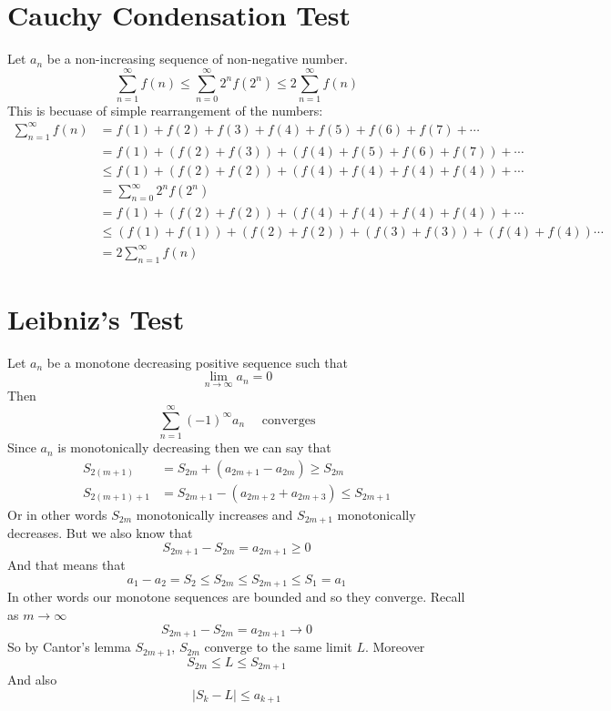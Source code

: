 \documentclass{article}
\begin{document}
	\section{Cauchy Condensation Test}
	Let $a_n$ be a non-increasing sequence of non-negative number.
	\[
		\sum_{n=1}^\infty {f(n)} \le 
		\sum_{n=0}^\infty{2^nf(2^n)}\le 2\sum_{n=1}^\infty {f(n)}
	\]
	This is becuase of simple rearrangement of the numbers:
	\begin{align*}
		\sum_{n=1}^\infty{f(n)} 
		& = f(1) +  f(2) + f(3)  +  f(4) + f(5) + f(6) + f(7)  +\cdots \\
 		& = f(1) + (f(2) + f(3)) + (f(4) + f(5) + f(6) + f(7)) +\cdots \\
 	   &\le f(1) + (f(2) + f(2)) + (f(4) + f(4) + f(4) + f(4)) +\cdots  \\
 		& =  \sum_{n=0}^\infty{2^nf(2^n)} \\
 		& = f(1) + (f(2) + f(2)) + (f(4) + f(4) + f(4) + f(4)) +\cdots \\
 		& \le  (f(1)+f(1))+(f(2)+f(2))+(f(3)+f(3))+(f(4)+f(4)) \cdots \\
 		& = 2\sum_{n=1}^\infty {f(n)}
	\end{align*}
	
	\newpage
	
	\section{Leibniz's Test}
	Let $a_n$ be a monotone decreasing positive sequence such that
	\[
		\lim_{n\to\infty}{a_n}=0
	\]
	Then
	\[
		\sum_{n=1}^{\infty}(-1)^{\infty}{a_n} \quad \text{ converges}
	\]
	Since $a_n$ is monotonically decreasing then we can say that
	\begin{align*}
		S_{2(m+1)} &= S_{2m} + (a_{2m+1} - a_{2m}) \ge S_{2m}\\
		S_{2(m+1)+1} &= S_{2m + 1} - (a_{2m+2} + a_{2m+3}) \le S_{2m + 1}
	\end{align*}
	Or in other words $S_{2m}$ monotonically increases and 
	$S_{2m+1}$  monotonically decreases. 
	But we also know that
	\[
		S_{2m+1} - S_{2m} =  a_{2m + 1} \ge 0
	\]
	And that means that
	\[
		a_1-a_2=S_2\le S_{2m}\le S_{2m+1}\le S_1 = a_1
	\]
	In other words our monotone sequences are bounded and so they converge. 
	Recall as $m\to\infty$
	\[
		S_{2m+1} - S_{2m} =  a_{2m + 1} \to 0
	\]
	So by Cantor's lemma $S_{2m+1}$, $S_{2m}$ converge to the same limit $L$. Moreover
	\[
		S_{2m}\le L \le S_{2m+1}
	\]
	And also
	\[
		|S_k-L|\le a_{k+1}
	\]
	
\end{document}
